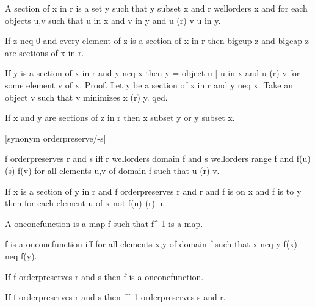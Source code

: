 \documentclass[a4paper,draft]{amsproc}
\begin{document}
\begin{forthel}
\begin{definition}
A section of x in r is a set y such that y subset x and r wellorders x
and for each objects u,v such that u in x and v in y and u (r) v u in y.
\end{definition}

\begin{theorem}
If z neq 0 and every element of z is a section of x in r then bigcup z and bigcap z are sections of x in r.
\end{theorem}

\begin{theorem}
If y is a section of x in r and y neq x then
y = {object u | u in x and u (r) v} for some element v of x.
Proof.
Let y be a section of x in r and y neq x.
Take an object v such that v minimizes x (r) y.
qed.
\end{theorem}

\begin{theorem}
If x and y are sections of z in r then x subset y or y subset x.
\end{theorem}

[synonym orderpreserve/-s]
\begin{definition}
f orderpreserves r and s iff r wellorders domain f and s wellorders range f
and f(u) (s) f(v) for all elements u,v of domain f such that u (r) v.
\end{definition}

\begin{theorem}
If x is a section of y in r and f orderpreserves r and r and f is on x and f is to y
then for each element u of x not f(u) (r) u.
\end{theorem}

\begin{definition}
A oneonefunction is a map f such that f^{-1} is a map.
\end{definition}

\begin{lemma}
f is a oneonefunction iff for all elements x,y of domain f such that x neq y f(x) neq f(y).
\end{lemma}

\begin{theorem}
If f orderpreserves r and s then f is a oneonefunction.
\end{theorem}

\begin{theorem}
If f orderpreserves r and s then f^{-1} orderpreserves s and r.
\end{theorem}


\end{forthel}
\end{document}

